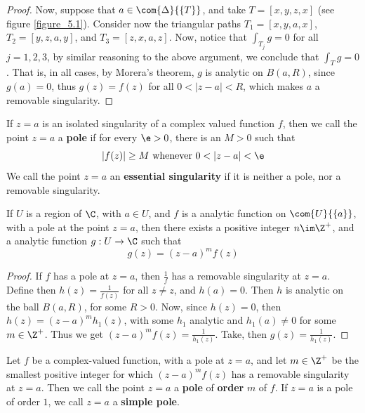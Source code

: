 \begin{proof}
    Now, suppose that $a \in \com{\Delta}{\{T\}}$, and take $T=[x,y,z,x]$ (see
    figure \ref{figure_5.1}). Consider now the triangular paths $T_1=[x,y,a,x]$,
    $T_2=[y,z,a,y]$, and $T_3=[z,x,a,z]$. Now, notice that $\int_{T_j}{g}=0$ for
    all $j=1,2,3$, by similar reasoning to the above argument, we conclude that
     $\int_T{g}=0$. That is, in all cases, by Morera's theorem, $g$ is
     analytic on  $B(a,R)$, since $g(a)=0$, thus $g(z)=f(z)$ for all
     $0<|z-a|<R$, which makes  $a$ a removable singularity.
\end{proof}

\begin{definition}
    If $z=a$ is an isolated singularity of a complex valued function $f$, then
    we call the point $z=a$ a  \textbf{pole} if for every $\e>0$, there is an
    $M>0$ such that
    \begin{equation*}
        |f(z)| \geq M \text{ whenever } 0<|z-a|<\e
    \end{equation*}
    We call the point $z=a$ an \textbf{essential singularity} if it is neither a
    pole, nor a removable singularity.
\end{definition}

\begin{lemma}\label{5.1.2}
    If $U$ is a region of  $\C$, with  $a \in U$, and  $f$ is a analytic
    function on  $\com{U}{\{a\}}$, with a pole at the point $z=a$, then there
    exists a positive integer  $n \im \Z^+$, and a analytic function  $g:U
    \xrightarrow{} \C$ such that
    \begin{equation*}
        g(z)=(z-a)^mf(z)
    \end{equation*}
\end{lemma}
\begin{proof}
    If $f$ has a pole at  $z=a$, then  $\frac{1}{f}$ has a removable singularity
    at $z=a$. Define then  $h(z)=\frac{1}{f(z)}$ for all $z \neq z$, and
    $h(a)=0$. Then $h$ is analytic on the ball  $B(a,R)$, for some $R>0$.
    Now, since  $h(z)=0$, then $h(z)=(z-a)^mh_1(z)$, with some $h_1$ analytic
    and $h_1(a) \neq 0$ for some $m \in \Z^+$. Thus we get
    $(z-a)^mf(z)=\frac{1}{h_1(z)}$. Take, then $g(z)=\frac{1}{h_1(z)}$.
\end{proof}

\begin{definition}
    Let $f$ be a complex-valued function, with a pole at  $z=a$, and let  $m \in
    \Z^+$ be the smallest positive integer for which  $(z-a)^mf(z)$ has a
    removable singularity at $z=a$. Then we call the point $z=a$ a
    \textbf{pole} of \textbf{order} $m$ of  $f$. If $z=a$ is a pole of order
    $1$, we call $z=a$ a \textbf{simple pole}.
\end{definition}

